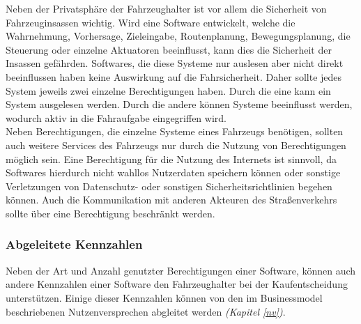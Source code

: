 Neben der Privatsphäre der Fahrzeughalter ist vor allem die Sicherheit von Fahrzeuginsassen wichtig. Wird eine Software entwickelt, welche die Wahrnehmung, Vorhersage, Zieleingabe, Routenplanung, Bewegungsplanung, die Steuerung oder einzelne Aktuatoren beeinflusst, kann dies die Sicherheit der Insassen gefährden. Softwares, die diese Systeme nur auslesen aber nicht direkt beeinflussen haben keine Auswirkung auf die Fahrsicherheit. Daher sollte jedes System jeweils zwei einzelne Berechtigungen haben. Durch die eine kann ein System ausgelesen werden. Durch die andere können Systeme beeinflusst werden, wodurch aktiv in die Fahraufgabe eingegriffen wird.\\

Neben Berechtigungen, die einzelne Systeme eines Fahrzeugs benötigen, sollten auch weitere Services des Fahrzeugs nur durch die Nutzung von Berechtigungen möglich sein. Eine Berechtigung für die Nutzung des Internets ist sinnvoll, da Softwares hierdurch nicht wahllos Nutzerdaten speichern können oder sonstige Verletzungen von Datenschutz- oder sonstigen Sicherheitsrichtlinien begehen können. Auch die Kommunikation mit anderen Akteuren des Straßenverkehrs sollte über eine Berechtigung beschränkt werden.

\subsubsection{Abgeleitete Kennzahlen}
Neben der Art und Anzahl genutzter Berechtigungen einer Software, können auch andere Kennzahlen einer Software den Fahrzeughalter bei der Kaufentscheidung unterstützen. Einige dieser Kennzahlen können von den im Businessmodel beschriebenen Nutzenversprechen abgleitet werden \textit{(Kapitel \ref{nv})}.\\

